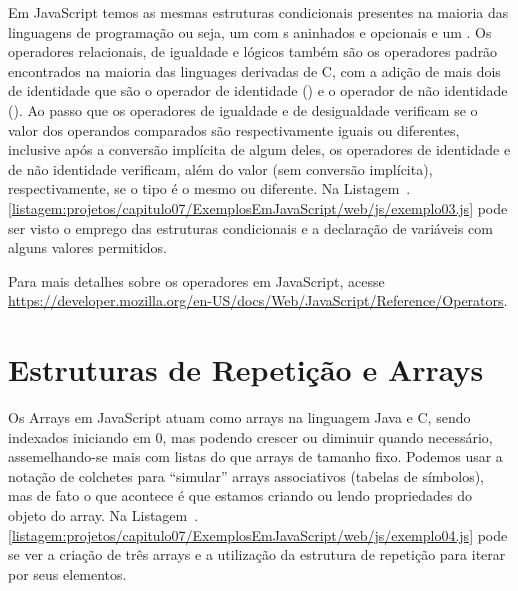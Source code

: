 Em JavaScript temos as mesmas estruturas condicionais presentes na maioria das linguagens de programação ou seja, um  com s aninhados e opcionais e um . Os operadores relacionais, de igualdade e lógicos também são os operadores padrão encontrados na maioria das linguages derivadas de C, com a adição de mais dois de identidade que são o operador de identidade (\inlineJavaScriptCode{===}) e o operador de não identidade (\inlineJavaScriptCode{!==}). Ao passo que os operadores de igualdade e de desigualdade verificam se o valor dos operandos comparados são respectivamente iguais ou diferentes, inclusive após a conversão implícita de algum deles, os operadores de identidade e de não identidade verificam, além do valor (sem conversão implícita), respectivamente, se o tipo é o mesmo ou diferente. Na Listagem~\thechapter.\ref{listagem:projetos/capitulo07/ExemplosEmJavaScript/web/js/exemplo03.js} pode ser visto o emprego das estruturas condicionais e a declaração de variáveis com alguns valores permitidos.


\begin{saibaMais}
    Para mais detalhes sobre os operadores em JavaScript, acesse \url{https://developer.mozilla.org/en-US/docs/Web/JavaScript/Reference/Operators}.
\end{saibaMais}


\section{Estruturas de Repetição e Arrays}

Os Arrays em JavaScript atuam como arrays na linguagem Java e C, sendo indexados iniciando em 0, mas podendo crescer ou diminuir quando necessário, assemelhando-se mais com listas do que arrays de tamanho fixo. Podemos usar a notação de colchetes para ``simular'' arrays associativos (tabelas de símbolos), mas de fato o que acontece é que estamos criando ou lendo propriedades do objeto do array. Na Listagem~\thechapter.\ref{listagem:projetos/capitulo07/ExemplosEmJavaScript/web/js/exemplo04.js} pode se ver a criação de três arrays e a utilização da estrutura de repetição  para iterar por seus elementos.


